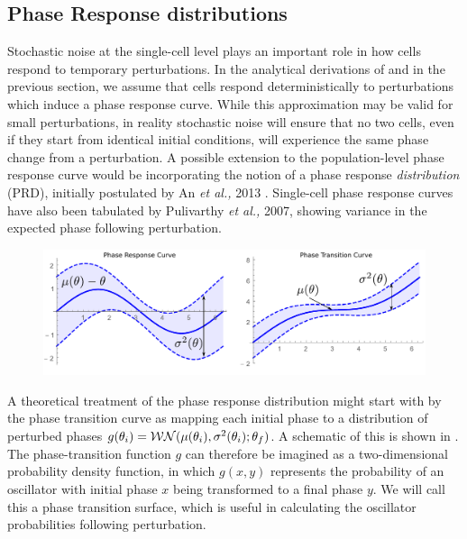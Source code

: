 \subsection{Phase Response distributions}

Stochastic noise at the single-cell level plays an important role in how cells respond to temporary perturbations.
In the analytical derivations of  and in the previous section, we assume that cells respond deterministically to perturbations which induce a phase response curve.
While this approximation may be valid for small perturbations, in reality stochastic noise will ensure that no two cells, even if they start from identical initial conditions, will experience the same phase change from a perturbation.
A possible extension to the population-level phase response curve would be incorporating the notion of a phase response {\itshape distribution} (PRD), initially postulated by An {\itshape et al.,} 2013 \cite{An2013}.
Single-cell phase response curves have also been tabulated by Pulivarthy {\itshape et al.,} 2007, showing variance in the expected phase following perturbation.

\begin{figure}[tbp]
  \centering
  \includegraphics[width=\textwidth]{chap7/figures/prd.pdf}
  \label{fig:prd-def}
\end{figure}

A theoretical treatment of the phase response distribution might start with by the phase transition curve as mapping each initial phase to a distribution of perturbed phases $g(\theta_i) = {\cal WN}(\mu(\theta_i), \sigma^2(\theta_i); \theta_f)$.
A schematic of this is shown in .
The phase-transition function $g$ can therefore be imagined as a two-dimensional probability density function, in which $g(x, y)$ represents the probability of an oscillator with initial phase $x$ being transformed to a final phase $y$.
We will call this a phase transition surface, which is useful in calculating the oscillator probabilities following perturbation.

